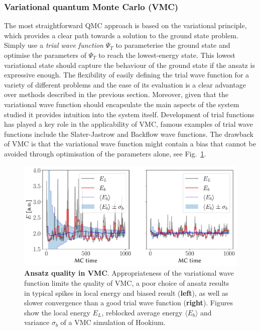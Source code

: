 \subsubsection{Variational quantum Monte Carlo (VMC)}
The most straightforward QMC approach is based on the variational principle, which provides a clear path towards a solution to the ground state problem. Simply use a \emph{trial wave function} $\Psi_{T}$ to parameterise the ground state and optimise the parameters of $\Psi_{T}$ to reach the lowest-energy state. This lowest variational state should capture the behaviour of the ground state if the ansatz is expressive enough. The flexibility of easily defining the trial wave function for a variety of different problems and the ease of its evaluation is a clear advantage over methods described in the previous section. Moreover, given that the variational wave function should encapsulate the main aspects of the system studied it provides intuition into the system itself. Development of trial functions has played a key role in the applicability of VMC, famous examples of trial wave functions include the Slater-Jastrow and Backflow wave functions. The drawback of VMC is that the variational wave function might contain a bias that cannot be avoided through optimisation of the parameters alone, see Fig.~\ref{fig:qmc_blocking}. 
\begin{figure}[h]
	\centering
	\includegraphics[width=\linewidth]{Chapter2/Figs/Vector/blocking}
	\caption[Ansatz quality in VMC]{\textbf{Ansatz quality in VMC}. Appropriateness of the variational wave function limits the quality of VMC, a poor choice of ansatz results in typical spikes in local energy  and biased result (\textbf{left}), as well as slower convergence than a good trial wave function (\textbf{right}). Figures show the local energy $E_L$, reblocked average energy $\langle E_b \rangle$ and variance $\sigma_b$ of a VMC simulation of Hookium.}
	\label{fig:qmc_blocking}
\end{figure}
